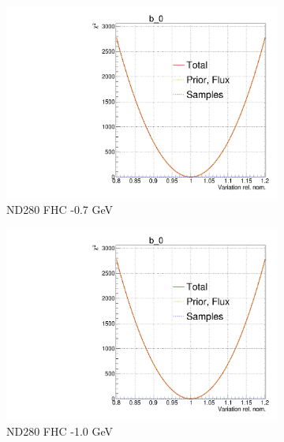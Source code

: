 \begin{figure}[h]
	\centering
\begin{subfigure}[t]{0.32\textwidth}
	\includegraphics[width=\textwidth, trim={0mm 0mm 0mm 11mm}, clip,page=5]{figures/mach3/Asimov/Full_LLHscan_18July_BeRPA_U_ND280logL_scan}
	\caption{ND280 FHC -0.7 GeV}
\end{subfigure}
\begin{subfigure}[t]{0.32\textwidth}
\includegraphics[width=\textwidth, trim={0mm 0mm 0mm 11mm}, clip,page=13]{figures/mach3/Asimov/Full_LLHscan_18July_BeRPA_U_ND280logL_scan}
	\caption{ND280 FHC -1.0 GeV}
\end{subfigure}
\begin{subfigure}[t]{0.32\textwidth}

\end{subfigure}
\end{figure}
